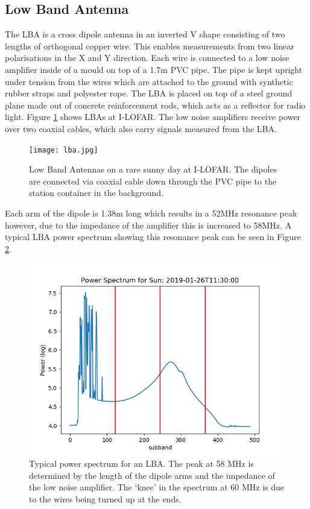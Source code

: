 \subsection{Low Band Antenna}
The LBA is a cross dipole antenna in an inverted V shape consisting of two lengths of orthogonal copper wire. This enables measurements from two linear polarisations in the X and Y direction. Each wire is connected to a low noise amplifier inside of a mould on top of a 1.7m PVC pipe. The pipe is kept upright under tension from the wires which are attached to the ground with synthetic rubber straps and polyester rope. The LBA is placed on top of a steel ground plane made out of concrete reinforcement rods, which acts as a reflector for radio light. Figure \ref{fig:LBA} shows LBAs at I-LOFAR. The low noise amplifiers receive power over two coaxial cables, which also carry signals measured from the LBA.

\begin{figure}
\centering
\texttt{[image: lba.jpg]}
\caption[Low Band Antennas at I-LOFAR]{Low Band Antennas on a rare sunny day at I-LOFAR. The dipoles are connected via coaxial cable down through the PVC pipe to the station container in the background.}
\label{fig:LBA}
\end{figure}

Each arm of the dipole is 1.38m long which results in a 52MHz resonance peak however, due to the impedance of the amplifier this is increased to 58MHz. A typical LBA power spectrum showing this resonance peak can be seen in Figure \ref{fig:LBA_power_spec}.

\begin{figure}
    \centering
    \includegraphics{Images/Sun_pspec.png}
    \caption[Typical power spectrum for an LBA.]{Typical power spectrum for an LBA. The peak at 58 MHz is determined by the length of the dipole arms and the impedance of the low noise amplifier. The `knee' in the spectrum at 60 MHz is due to the wires being turned up at the ends.}
    \label{fig:LBA_power_spec}
\end{figure}

